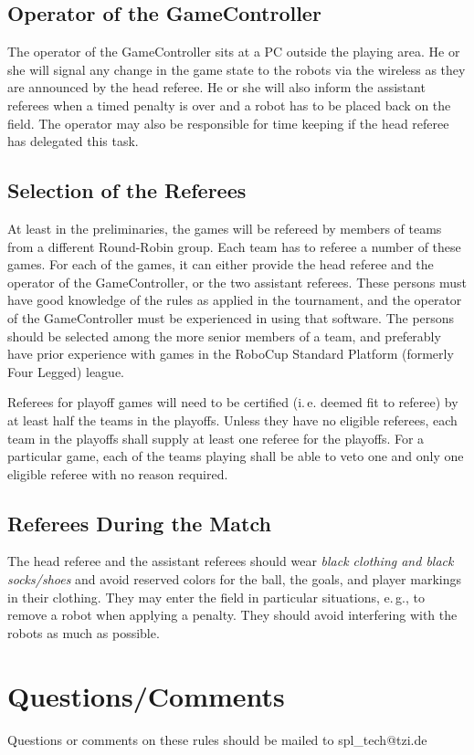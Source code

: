 \documentclass[12pt]{article}
\newcommand{\ie}{\mbox{i.\,e.}\xspace}
\newcommand{\eg}{\mbox{e.\,g.}\xspace}
\begin{document}
\subsection{Operator of the GameController}

The operator of the GameController sits at a PC outside the playing area. He or she will signal any change in the game state to the robots via the wireless as they are announced by the head referee. He or she will also inform the assistant referees when a timed penalty is over and a robot has to be placed back on the field. The operator may also be responsible for time keeping if the head referee has delegated this task.

\subsection{Selection of the Referees}

At least in the preliminaries, the games will be refereed by members of teams from a different Round-Robin group. Each team has to referee a number of these games. For each of the games, it can either provide the head referee and the operator of the GameController, or the two assistant referees. These persons must have good knowledge of the rules as applied in the tournament, and the operator of the GameController must be experienced in using that software. The persons should be selected among the more senior members of a team, and preferably have prior experience with games in the RoboCup Standard Platform (formerly Four Legged) league.

Referees for playoff games will need to be certified (\ie deemed fit to referee) by at least half the teams in the playoffs. Unless they have no eligible referees, each team in the playoffs shall supply at least one referee for the playoffs. For a particular game, each of the teams playing shall be able to veto one and only one eligible referee with no reason required.

\subsection{Referees During the Match}

The head referee and the assistant referees should wear \emph{black clothing and black socks/shoes} and avoid reserved colors for the ball, the goals, and player markings in their clothing. They may enter the field in particular situations, \eg, to remove a robot when applying a penalty. They should avoid interfering with the robots as much as possible.

\section{Questions/Comments}

Questions or comments on these rules should be mailed to spl\_tech@tzi.de
\end{document}
